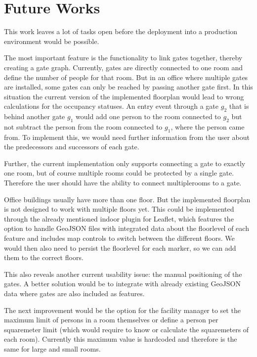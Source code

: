 \section{Future Works}

This work leaves a lot of tasks open before the deployment into a production environment would be possible.

The most important feature is the functionality to link gates together, thereby creating a gate graph. Currently, gates are directly connected to one room and define the number of people for that room. But in an office where multiple gates are installed, some gates can only be reached by passing another gate first. In this situation the current version of the implemented floorplan would lead to wrong calculations for the occupancy statuses. An entry event through a gate \(g_2\) that is behind another gate \(g_1\) would add one person to the room connected to \(g_2\) but not subtract the person from the room connected to \(g_1\), where the person came from. To implement this, we would need further information from the user about the predecessors and successors of each gate.

Further, the current implementation only supports connecting a gate to exactly one room, but of course multiple rooms could be protected by a single gate. Therefore the user should have the ability to connect multiplerooms to a gate.

Office buildings usually have more than one floor. But the implemented floorplan is not designed to work with multiple floors yet. This could be implemented through the already mentioned indoor plugin for Leaflet, which features the option to handle GeoJSON files with integrated data about the floorlevel of each feature and includes map controls to switch between the different floors. We would then also need to persist the floorlevel for each marker, so we can add them to the correct floors.

This also reveals another current usability issue: the manual positioning of the gates. A better solution would be to integrate with already existing GeoJSON data where gates are also included as features.

The next improvement would be the option for the facility manager to set the maximum limit of persons in a room themselves or define a person per squaremeter limit (which would require to know or calculate the squaremeters of each room). Currently this maximum value is hardcoded and therefore is the same for large and small rooms.

